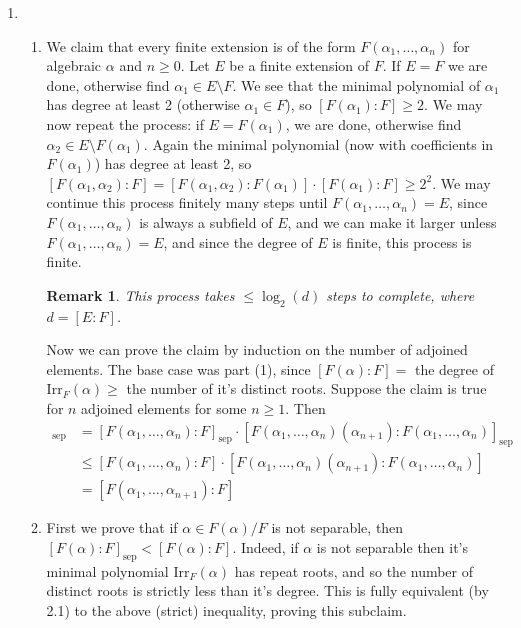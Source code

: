 \documentclass[12pt]{article}
\theoremstyle{definitionstyle}
\newtheorem*{remark}{Remark}
\newcommand{\sepdeg}[1]{[#1]_{\mathrm{sep}}}
\begin{document}
\begin{enumerate}[leftmargin=\labelsep]
		\item
		\begin{enumerate}[label=(\arabic*)]
			\item We claim that every finite extension is of the form $F(\alpha_1, \ldots, \alpha_n)$ for algebraic $\alpha$ and $n \geq 0$. Let $E$ be a finite extension of $F$. If $E = F$ we are done, otherwise find $\alpha_1 \in E \setminus F$. We see that the minimal polynomial of $\alpha_1$ has degree at least 2 (otherwise $\alpha_1 \in F$), so $[F(\alpha_1) : F] \geq 2$. We may now repeat the process: if $E = F(\alpha_1)$, we are done, otherwise find $\alpha_2 \in E \setminus F(\alpha_1)$. Again the minimal polynomial (now with coefficients in $F(\alpha_1)$) has degree at least 2, so $[F(\alpha_1, \alpha_2) : F] = [F(\alpha_1, \alpha_2) : F(\alpha_1)] \cdot [F(\alpha_1) : F] \geq 2^2$. We may continue this process finitely many steps until $F(\alpha_1, \ldots, \alpha_n) = E$, since $F(\alpha_1, \ldots, \alpha_n)$ is always a subfield of $E$, and we can make it larger unless $F(\alpha_1, \ldots, \alpha_n) = E$, and since the degree of $E$ is finite, this process is finite.
			\begin{remark}
				This process takes $\leq \log_2(d)$ steps to complete, where $d = [E : F]$.
			\end{remark}
			Now we can prove the claim by induction on the number of adjoined elements. The base case was part (1), since $[F(\alpha) : F] = $ the degree of $\mathrm{Irr}_F(\alpha) \geq $ the number of it's distinct roots. Suppose the claim is true for $n$ adjoined elements for some $n \geq 1$. Then 
			\begin{align*}
				\sepdeg{F(\alpha_1, \cdots, \alpha_{n+1}) : F} &= \sepdeg{F(\alpha_1, \ldots, \alpha_n) : F} \cdot \sepdeg{F(\alpha_1, \ldots, \alpha_n)(\alpha_{n+1}) : F(\alpha_1, \ldots, \alpha_n)} \\
				&\leq [F(\alpha_1, \ldots, \alpha_n) : F] \cdot [F(\alpha_1, \ldots, \alpha_n)(\alpha_{n+1}) : F(\alpha_1, \ldots, \alpha_n)] \\
				&= [F(\alpha_1, \ldots, \alpha_{n+1}) : F]
			\end{align*}
		
		\item First we prove that if $\alpha \in F(\alpha)/F$ is not separable, then $\sepdeg{F(\alpha) : F} < [F(\alpha) : F]$. Indeed, if $\alpha$ is not separable then it's minimal polynomial $\mathrm{Irr}_F(\alpha)$ has repeat roots, and so the number of distinct roots is strictly less than it's degree. This is fully equivalent (by 2.1) to the above (strict) inequality, proving this subclaim. 
		

\end{enumerate}
\end{enumerate}
\end{document}
